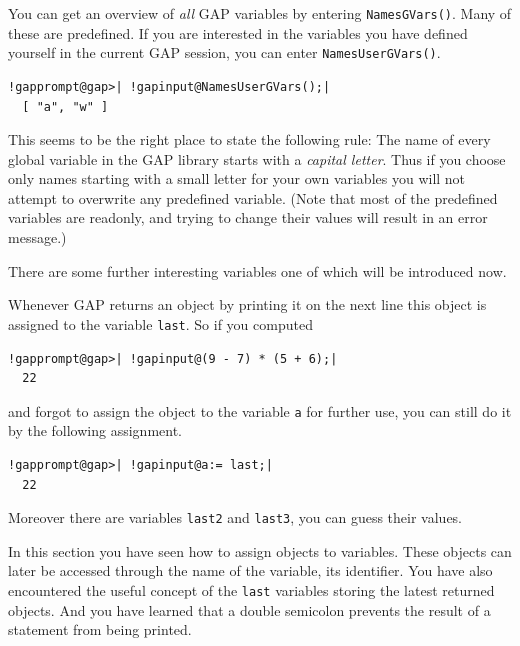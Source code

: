 \documentclass[a4paper,11pt]{report}
\begin{document}
{{ You can get an overview of \emph{all} \textsf{GAP} variables by entering \texttt{NamesGVars()}. Many of these are predefined. If you are interested in the variables you
have defined yourself in the current \textsf{GAP} session, you can enter \texttt{NamesUserGVars()}. 

 
\begin{Verbatim}[commandchars=!@|,fontsize=\small,frame=single,label=Example]
  !gapprompt@gap>| !gapinput@NamesUserGVars();|
  [ "a", "w" ]
\end{Verbatim}
 

 This seems to be the right place to state the following rule: The name of
every global variable in the \textsf{GAP} library starts with a \emph{capital letter}. Thus if you choose only names starting with a small letter for your own
variables you will not attempt to overwrite any predefined variable. (Note
that most of the predefined variables are read\texttt{}only, and
trying to change their values will result in an error message.) 

 There are some further interesting variables one of which will be introduced
now. 

    Whenever \textsf{GAP} returns an object by printing it on the next line this object is assigned to
the variable \texttt{last}. So if you computed 

 
\begin{Verbatim}[commandchars=!@|,fontsize=\small,frame=single,label=Example]
  !gapprompt@gap>| !gapinput@(9 - 7) * (5 + 6);|
  22
\end{Verbatim}
 

 and forgot to assign the object to the variable \texttt{a} for further use, you can still do it by the following assignment. 

 
\begin{Verbatim}[commandchars=!@|,fontsize=\small,frame=single,label=Example]
  !gapprompt@gap>| !gapinput@a:= last;|
  22
\end{Verbatim}
 

 Moreover there are variables \texttt{last2} and \texttt{last3}, you can guess their values. 

  In this section you have seen how to assign objects to variables. These
objects can later be accessed through the name of the variable, its
identifier. You have also encountered the useful concept of the \texttt{last} variables storing the latest returned objects. And you have learned that a
double semicolon prevents the result of a statement from being printed. }

}
\end{document}
